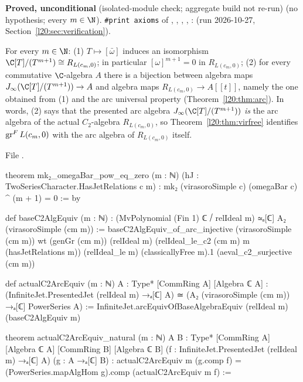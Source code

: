 \begin{status}
\textbf{Proved, unconditional} (isolated-module check; aggregate build not re-run) (no hypothesis; every $m\in\N$). \texttt{\#print axioms} of ,
, , , :
 (run 2026-10-27, Section~\ref{l20:sec:verification}).
\end{status}

\begin{theorem}\label{l20:thm:virc2}
For every $m\in\N$: (1) $T\mapsto[\bar\omega]$ induces an isomorphism $\C[T]/(T^{m+1})\cong R_{L(c_m,0)}$; in particular
$[\omega]^{m+1}=0$ in $R_{L(c_m,0)}$; (2) for every commutative $\C$-algebra $A$ there is a bijection between algebra maps
$\ltwentyJ(\C[T]/(T^{m+1}))\to A$ and algebra maps $R_{L(c_m,0)}\to A[[t]]$, namely the one obtained from (1) and the arc universal
property (Theorem~\ref{l20:thm:arc}). In words, (2) says that the presented arc algebra $\ltwentyJ(\C[T]/(T^{m+1}))$
\emph{is} the arc algebra of the actual $C_2$-algebra $R_{L(c_m,0)}$, so Theorem~\ref{l20:thm:virfree} identifies $\operatorname{gr}^F L(c_m,0)$
with the arc algebra of $R_{L(c_m,0)}$ itself.
\end{theorem}
\noindent File .
\begin{leancode}
theorem mk₂_omegaBar_pow_eq_zero (m : ℕ) (hJ : TwoSeriesCharacter.HasJetRelations c m) :
    mk₂ (virasoroSimple c) (omegaBar c) ^ (m + 1) = 0 := by

def baseC2AlgEquiv (m : ℕ) :
    (MvPolynomial (Fin 1) ℂ ⧸ relIdeal m) ≃ₐ[ℂ] A₂ (virasoroSimple (cm m)) :=
  baseC2AlgEquiv_of_arc_injective (virasoroSimple (cm m)) wt (genGr (cm m)) (relIdeal m)
    (relIdeal_le_c2 (cm m) m (hasJetRelations m)) (relIdeal_le m) (classicallyFree m).1
    (aeval_c2_surjective (cm m))

def actualC2ArcEquiv (m : ℕ) {A : Type*} [CommRing A] [Algebra ℂ A] :
    (InfiniteJet.PresentedJet (relIdeal m) →ₐ[ℂ] A) ≃
      (A₂ (virasoroSimple (cm m)) →ₐ[ℂ] PowerSeries A) :=
  InfiniteJet.arcEquivOfBaseAlgebraEquiv (relIdeal m) (baseC2AlgEquiv m)

theorem actualC2ArcEquiv_natural (m : ℕ) {A B : Type*} [CommRing A] [Algebra ℂ A]
    [CommRing B] [Algebra ℂ B] (f : InfiniteJet.PresentedJet (relIdeal m) →ₐ[ℂ] A)
    (g : A →ₐ[ℂ] B) :
    actualC2ArcEquiv m (g.comp f) = (PowerSeries.mapAlgHom g).comp (actualC2ArcEquiv m f) :=
\end{leancode}

